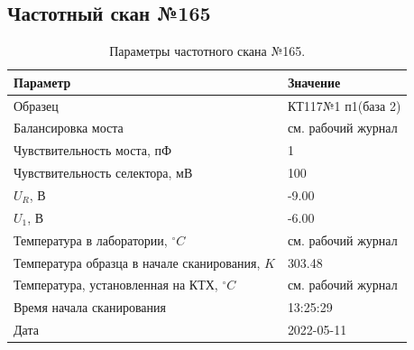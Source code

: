 \subsection{Частотный скан №165}
\begin{table}[!ht]
    \centering
    \caption{Параметры частотного скана №165.}
    \begin{tabular}{|l|l|}
        \hline
        Параметр                                       & Значение                  \\ \hline
        Образец                                        & КТ117№1 п1(база 2)        \\ \hline
        Балансировка моста                             & см. рабочий журнал        \\ \hline
        Чувствительность моста, пФ                     & 1                         \\ \hline
        Чувствительность селектора, мВ                 & 100                       \\ \hline
        $U_R$, В                                       & -9.00                     \\ \hline
        $U_1$, В                                       & -6.00                     \\ \hline
        Температура в лаборатории, $^\circ C$          & см. рабочий журнал        \\ \hline
        Температура образца в начале сканирования, $K$ & 303.48                    \\ \hline
        Температура, установленная на КТХ, $^\circ C$  & см. рабочий журнал        \\ \hline
        Время начала сканирования                      & 13:25:29                  \\ \hline
        Дата                                           & 2022-05-11                \\ \hline
    \end{tabular}
    \label{table:frequency_scan_165}
\end{table}

